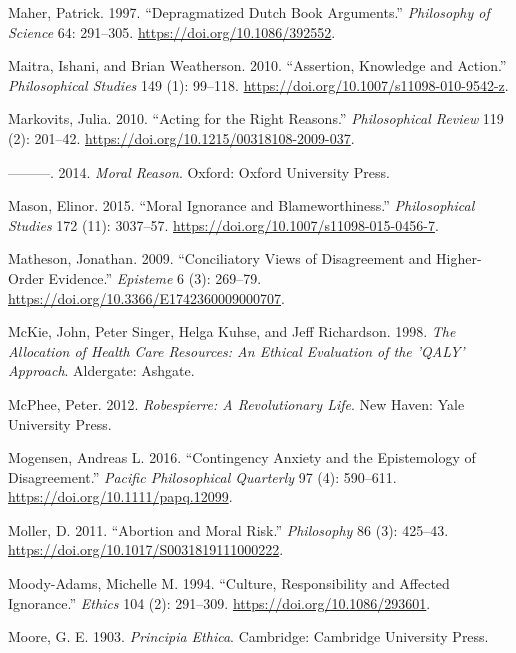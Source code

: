 \documentclass[
  10pt,
  letterpaper,
  twoside]{scrbook}
\newlength{\cslhangindent}
\newenvironment{CSLReferences}[2] %
 {\begin{list}{}{%
  \setlength{\itemindent}{0pt}
  \setlength{\leftmargin}{0pt}
  \setlength{\parsep}{0pt}
  \ifodd #1
   \setlength{\leftmargin}{\cslhangindent}
   \setlength{\itemindent}{-1\cslhangindent}
  \fi
  \setlength{\itemsep}{#2\baselineskip}}}
 {\end{list}}
\begin{document}
\begin{CSLReferences}{1}{0}
Maher, Patrick. 1997. {``Depragmatized Dutch Book Arguments.''}
\emph{Philosophy of Science} 64: 291--305.
\url{https://doi.org/10.1086/392552}.

Maitra, Ishani, and Brian Weatherson. 2010. {``Assertion, Knowledge and
Action.''} \emph{Philosophical Studies} 149 (1): 99--118.
\url{https://doi.org/10.1007/s11098-010-9542-z}.

Markovits, Julia. 2010. {``Acting for the Right Reasons.''}
\emph{Philosophical Review} 119 (2): 201--42.
\url{https://doi.org/10.1215/00318108-2009-037}.

---------. 2014. \emph{Moral Reason}. Oxford: Oxford University Press.

Mason, Elinor. 2015. {``Moral Ignorance and Blameworthiness.''}
\emph{Philosophical Studies} 172 (11): 3037--57.
\url{https://doi.org/10.1007/s11098-015-0456-7}.

Matheson, Jonathan. 2009. {``Conciliatory Views of Disagreement and
Higher-Order Evidence.''} \emph{Episteme} 6 (3): 269--79.
\url{https://doi.org/10.3366/E1742360009000707}.

McKie, John, Peter Singer, Helga Kuhse, and Jeff Richardson. 1998.
\emph{The Allocation of Health Care Resources: An Ethical Evaluation of
the 'QALY' Approach}. Aldergate: Ashgate.

McPhee, Peter. 2012. \emph{Robespierre: A Revolutionary Life}. New
Haven: Yale University Press.

Mogensen, Andreas L. 2016. {``Contingency Anxiety and the Epistemology
of Disagreement.''} \emph{Pacific Philosophical Quarterly} 97 (4):
590--611. \url{https://doi.org/10.1111/papq.12099}.

Moller, D. 2011. {``Abortion and Moral Risk.''} \emph{Philosophy} 86
(3): 425--43. \url{https://doi.org/10.1017/S0031819111000222}.

Moody-Adams, Michelle M. 1994. {``Culture, Responsibility and Affected
Ignorance.''} \emph{Ethics} 104 (2): 291--309.
\url{https://doi.org/10.1086/293601}.

Moore, G. E. 1903. \emph{Principia Ethica}. Cambridge: Cambridge
University Press.


\end{CSLReferences}
\end{document}
